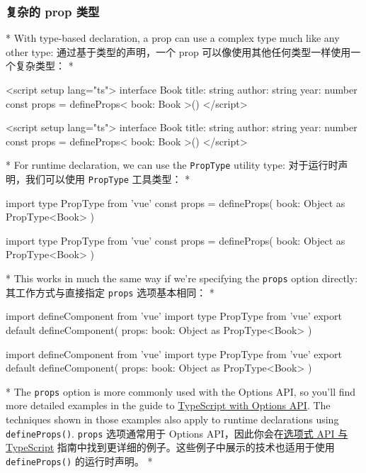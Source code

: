 \begin{paracol}{2}
\subsubsection{复杂的 prop 类型}
\switchcolumn[0]*%
With type-based declaration, a prop can use a complex type much like any
other type:
\switchcolumn
通过基于类型的声明，一个 prop
可以像使用其他任何类型一样使用一个复杂类型：
\switchcolumn[0]*%
\begin{codeHtml}
<script setup lang="ts">
interface Book {
  title: string
  author: string
  year: number
}
const props = defineProps<{
  book: Book
}>()
</script>
\end{codeHtml}
\switchcolumn
\begin{codeHtml}
<script setup lang="ts">
interface Book {
  title: string
  author: string
  year: number
}
const props = defineProps<{
  book: Book
}>()
</script>
\end{codeHtml}
\switchcolumn[0]*%
For runtime declaration, we can use the \texttt{PropType} utility type:
\switchcolumn
对于运行时声明，我们可以使用 \texttt{PropType} 工具类型：
\switchcolumn[0]*%
\begin{codeTs}
import type { PropType } from 'vue'
const props = defineProps({
  book: Object as PropType<Book>
})
\end{codeTs}
\switchcolumn
\begin{codeTs}
import type { PropType } from 'vue'
const props = defineProps({
  book: Object as PropType<Book>
})
\end{codeTs}
\switchcolumn[0]*%
This works in much the same way if we're specifying the \texttt{props}
option directly:
\switchcolumn
其工作方式与直接指定 \texttt{props} 选项基本相同：
\switchcolumn[0]*%
\begin{codeTs}
import { defineComponent } from 'vue'
import type { PropType } from 'vue'
export default defineComponent({
  props: {
    book: Object as PropType<Book>
  }
})
\end{codeTs}
\switchcolumn
\begin{codeTs}
import { defineComponent } from 'vue'
import type { PropType } from 'vue'
export default defineComponent({
  props: {
    book: Object as PropType<Book>
  }
})
\end{codeTs}
\switchcolumn[0]*%
The \texttt{props} option is more commonly used with the Options API, so
you'll find more detailed examples in the guide to
\href{https://vuejs.org/guide/typescript/options-api.html\#typing-component-props}{TypeScript
with Options API}. The techniques shown in those examples also apply to
runtime declarations using \texttt{defineProps()}.
\switchcolumn
\texttt{props} 选项通常用于 Options
API，因此你会在\href{https://cn.vuejs.org/guide/typescript/options-api.html\#typing-component-props}{选项式
API 与 TypeScript}
指南中找到更详细的例子。这些例子中展示的技术也适用于使用
\texttt{defineProps()} 的运行时声明。
\switchcolumn[0]*%

\end{paracol}
